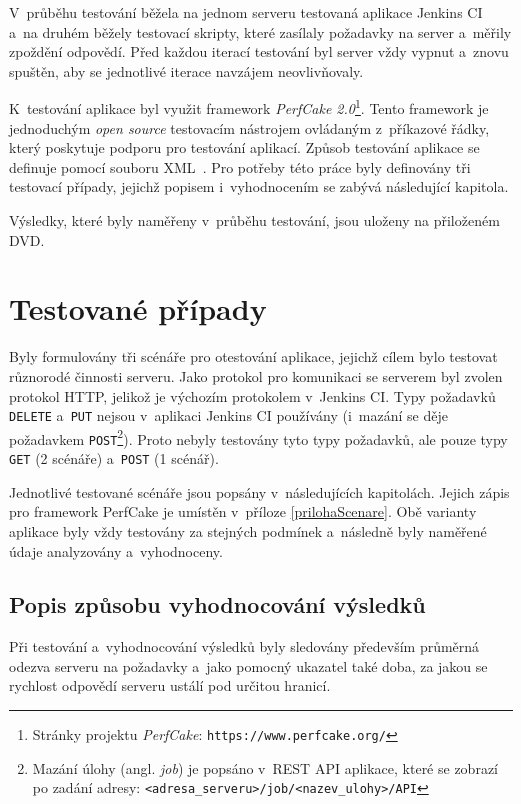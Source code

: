         V~průběhu testování běžela na jednom serveru testovaná aplikace Jenkins CI a~na druhém běžely testovací
        skripty, které zasílaly požadavky na server a~měřily zpoždění odpovědí.
        Před každou iterací testování byl server vždy vypnut a~znovu spuštěn, aby se jednotlivé
        iterace navzájem neovlivňovaly.
        \medskip

        K~testování aplikace byl využit framework \emph{PerfCake 2.0}\footnote{Stránky projektu \emph{PerfCake}: 
        \texttt{https://www.perfcake.org/}}. Tento framework je jednoduchým \emph{open source} testovacím nástrojem
        ovládaným z~příkazové řádky, 
        který poskytuje podporu pro testování aplikací. Způsob testování aplikace se definuje pomocí
        souboru XML~\cite{perfcake}.
        Pro potřeby této práce byly definovány tři testovací případy, jejichž popisem i~vyhodnocením se 
        zabývá následující kapitola. 

        Výsledky, které byly naměřeny v~průběhu testování, jsou uloženy na přiloženém DVD.
             
        

    \section{Testované případy} \label{testovanePripady}
        Byly formulovány tři scénáře pro otestování aplikace, jejichž cílem bylo testovat různorodé
        činnosti serveru.        
        Jako protokol pro komunikaci
        se serverem byl zvolen protokol HTTP, jelikož je výchozím protokolem v~Jenkins CI.
        Typy požadavků \texttt{DELETE} a~\texttt{PUT} nejsou v~aplikaci Jenkins CI používány (i~mazání
        se děje požadavkem \texttt{POST}\footnote{Mazání úlohy (angl. \emph{job}) je popsáno v~REST API aplikace,
        které se zobrazí po zadání adresy: \texttt{<adresa\_serveru>/job/<nazev\_ulohy>/API}}). 
        Proto nebyly testovány tyto typy požadavků, ale pouze typy \texttt{GET} (2 scénáře) a~\texttt{POST} (1 scénář). 

        Jednotlivé testované scénáře jsou popsány v~následujících kapitolách. Jejich zápis
        pro framework PerfCake je umístěn v~příloze \ref{prilohaScenare}.
        Obě varianty aplikace byly vždy testovány za stejných podmínek a~následně byly naměřené údaje analyzovány
        a~vyhodnoceny.

        \subsection{Popis způsobu vyhodnocování výsledků} \label{zpusobVyhodnoceniVysledku}
            Při testování a~vyhodnocování výsledků byly sledovány především průměrná odezva serveru na požadavky
            a~jako pomocný ukazatel také doba, za jakou se rychlost odpovědí serveru ustálí pod určitou hranicí.
            
